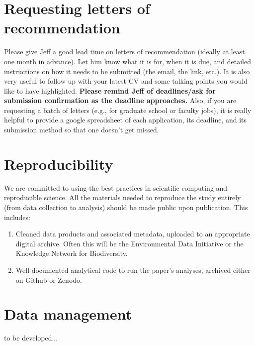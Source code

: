 \documentclass[12pt]{article}
\begin{document}
\section{Requesting letters of recommendation}
Please give Jeff a good lead time on letters of recommendation (ideally at least one month in advance). Let him know what it is for, when it is due, and detailed instructions on how it needs to be submitted (the email, the link, etc.). It is also very useful to follow up with your latest CV and some talking points you would like to have highlighted. \textbf{Please remind Jeff of deadlines/ask for submission confirmation as the deadline approaches.} Also, if you are requesting a batch of letters (e.g., for graduate school or faculty jobs), it is really helpful to provide a google spreadsheet of each application, its deadline, and its submission method so that one doesn't get missed.


\section{Reproducibility}
We are committed to using the best practices in scientific computing and reproducible science. All the materials needed to reproduce the study entirely (from data collection to analysis) should be made public upon publication. This includes:
\begin{enumerate}
\item Cleaned data products and associated metadata, uploaded to an appropriate digital archive. Often this will be the Environmental Data Initiative or the Knowledge Network for Biodiversity.
\item Well-documented analytical code to run the  paper's analyses, archived either on Github or Zenodo.
\end{enumerate}

\section{Data management}
to be developed...
\end{document}
